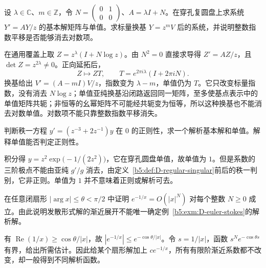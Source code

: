 \begin{exercise}
	设 \(\lambda\in\mathbb C\)、\(m\in\mathbb Z\)，令
	\(N=\begin{pmatrix}0&1\\0&0\end{pmatrix}\)、\(A=\lambda I+N\)。在穿孔复圆盘上求系统 \(Y'=AY/z\) 的基本解矩阵与单值。求标量换基 \(Y=z^mV\) 后的系统，并说明整数指数平移是否能够消去对数项。
\end{exercise}
\begin{solution}
	在通用覆盖上取 \(Z=z^\lambda(I+N\log z)\)。由 \(N^2=0\) 直接求导得 \(Z'=AZ/z\)，且 \(\det Z=z^{2\lambda}\ne0\)。正向延拓后，
	\[
		Z\longmapsto ZT,\qquad T=e^{2\pi i\lambda}(I+2\pi iN).
	\]
	换基给出 \(V'=(A-mI)V/z\)，指数变为 \(\lambda-m\)，单值仍为 \(T\)。它只改变标量指数，没有消去 \(N\log z\)；单值亚纯换基沿闭路返回同一矩阵，至多使基点表示中的单值矩阵共轭；非恒等的幺幂矩阵不可能经共轭变为恒等，所以这种换基也不能消去对数单值。对数项不能只靠整数指数平移消失。
\end{solution}

\begin{exercise}
	判断秩一方程 \(y'=(z^{-3}+2z^{-1})y\) 在 \(0\) 的正则性，求一个解析基本解和单值。解释单值能否判定正则性。
\end{exercise}
\begin{solution}
	积分得 \(y=z^2\exp\bigl(-1/(2z^2)\bigr)\)，它在穿孔圆盘单值，故单值为 \(1\)。但是系数的三阶极点不能由亚纯 \(g'/g\) 消去，由定义~\ref{b5:def:D-regular-singular}前后的秩一判别，它非正则。单值为 \(1\) 并不意味着正则或解析可去。
\end{solution}

\begin{exercise}
	在任意闭扇形 \(|\arg x|\le\theta<\pi/2\) 中证明 \(e^{-1/x}=O(|x|^N)\) 对每个整数 \(N\ge0\) 成立。由此说明发散形式解的渐近展开不能唯一确定例~\ref{b5:exm:D-euler-stokes}的解析解。
\end{exercise}
\begin{solution}
	有 \(\operatorname{Re}(1/x)\ge\cos\theta/|x|\)，故 \(|e^{-1/x}|\le e^{-\cos\theta/|x|}\)。令 \(s=1/|x|\)，函数 \(s^Ne^{-\cos\theta s}\) 有界，给出所需估计。因此给某个扇形解加上 \(ce^{-1/x}\)，所有有限阶渐近系数都不改变，却一般得到不同解析函数。
\end{solution}

